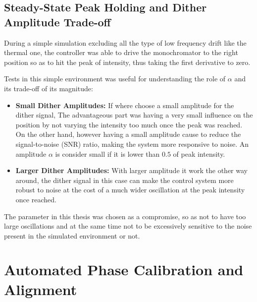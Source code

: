 \subsection{Steady-State Peak Holding and Dither Amplitude Trade-off}
During a simple simulation excluding all the type of low frequency drift like the thermal one, the controller was able to drive the monochromator to the right position so as to hit the peak of intensity, thus taking the first derivative to zero. 

Tests in this simple environment was useful for understanding the role of $\alpha$ and its trade-off of its magnitude:
\begin{itemize}
    \item \textbf{Small Dither Amplitudes:} 
    If where choose a small amplitude for the dither signal, The advantageous part was having a very small influence on the position by not varying the intensity too much once the peak was reached. On the other hand, however having a small amplitude cause to reduce the signal-to-noise (SNR) ratio, making the system more responsive to noise. An amplitude $\alpha$ is consider small if it is lower than $0.5$ of peak intensity.
    \item \textbf{Larger Dither Amplitudes:} 
    With larger amplitude it work the other way around, the dither signal in this case can make the control system more robust to noise at the cost of a much wider oscillation at the peak intensity once reached.
\end{itemize}
The parameter in this thesis was chosen as a compromise, so as not to have too large oscillations and at the same time not to be excessively sensitive to the noise present in the simulated environment or not.

\section{Automated Phase Calibration and Alignment}

